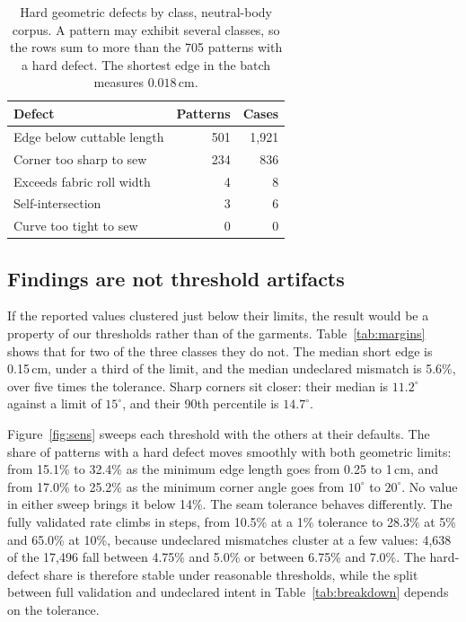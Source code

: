 \documentclass[10pt,twocolumn]{article}
\begin{document}
\begin{table}[t]
\centering
\begin{tabular}{lrr}
\toprule
Defect & Patterns & Cases \\
\midrule
Edge below cuttable length & 501 & 1{,}921 \\
Corner too sharp to sew & 234 & 836 \\
Exceeds fabric roll width & 4 & 8 \\
Self-intersection & 3 & 6 \\
Curve too tight to sew & 0 & 0 \\
\bottomrule
\end{tabular}
\caption{Hard geometric defects by class, neutral-body corpus. A pattern may
exhibit several classes, so the rows sum to more than the 705 patterns with a
hard defect. The shortest edge in the batch measures $0.018$\,cm.}
\label{tab:defects}
\end{table}

\subsection{Findings are not threshold artifacts}
\label{sec:res-robust}

If the reported values clustered just below their limits, the result would be a
property of our thresholds rather than of the garments. Table~\ref{tab:margins}
shows that for two of the three classes they do not. The median short edge is
0.15\,cm, under a third of the limit, and the median undeclared mismatch is
5.6\%, over five times the tolerance. Sharp corners sit closer: their median is
$11.2^\circ$ against a limit of $15^\circ$, and their 90th percentile is
$14.7^\circ$.

Figure~\ref{fig:sens} sweeps each threshold with the others at their defaults.
The share of patterns with a hard defect moves smoothly with both geometric
limits: from 15.1\% to 32.4\% as the minimum edge length goes from 0.25 to
1\,cm, and from 17.0\% to 25.2\% as the minimum corner angle goes from
$10^\circ$ to $20^\circ$. No value in either sweep brings it below 14\%. The
seam tolerance behaves differently. The fully validated rate climbs in steps,
from 10.5\% at a 1\% tolerance to 28.3\% at 5\% and 65.0\% at 10\%, because
undeclared mismatches cluster at a few values: 4{,}638 of the 17{,}496 fall
between 4.75\% and 5.0\% or between 6.75\% and 7.0\%. The hard-defect share is
therefore stable under reasonable thresholds, while the split between full
validation and undeclared intent in Table~\ref{tab:breakdown} depends on the
tolerance.
\end{document}
